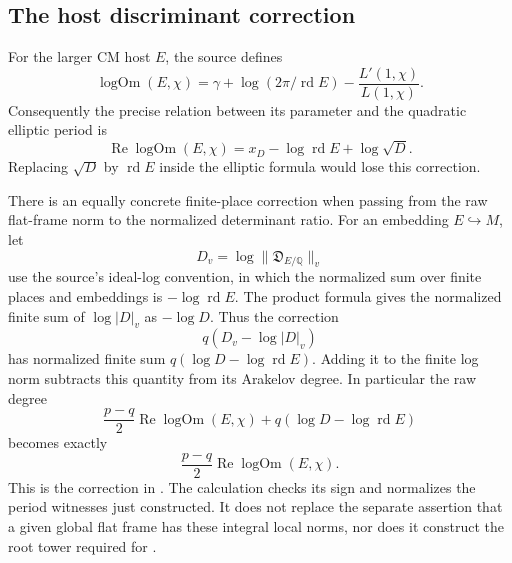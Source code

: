 \subsection{The host discriminant correction}

For the larger CM host \(E\), the source defines
\[
 \operatorname{logOm}(E,\chi)
    =\gamma+\log(2\pi/\operatorname{rd}E)
                            -\frac{L'(1,\chi)}{L(1,\chi)} .
\]
Consequently the precise relation between its parameter
and the quadratic elliptic period is
\begin{equation}\label{eq:sr-cm-period-host}
 \operatorname{Re}\operatorname{logOm}(E,\chi)
       =x_D-\log\operatorname{rd}E+\log\sqrt D .
\end{equation}
Replacing \(\sqrt D\) by \(\operatorname{rd}E\) inside
the elliptic formula would lose this correction.

There is an equally concrete finite-place correction
when passing from the raw flat-frame norm to the
normalized determinant ratio.
For an embedding \(E\hookrightarrow M\), let
\[
 D_v=\log\|\mathfrak D_{E/\mathbb Q}\|_v
\]
use the source's ideal-log convention, in which the
normalized sum over finite places and embeddings is
\(-\log\operatorname{rd}E\).
The product formula gives the normalized finite sum of
\(\log|D|_v\) as \(-\log D\).
Thus the correction
\[
                       q(D_v-\log|D|_v)
\]
has normalized finite sum
\(q(\log D-\log\operatorname{rd}E)\).
Adding it to the finite log norm subtracts this quantity
from its Arakelov degree.
In particular the raw degree
\[
 \frac{p-q}{2}\operatorname{Re}\operatorname{logOm}(E,\chi)
          +q(\log D-\log\operatorname{rd}E)
\]
becomes exactly
\[
                 \frac{p-q}{2}
                       \operatorname{Re}\operatorname{logOm}(E,\chi).
\]
This is the correction in
.
The calculation checks its sign and normalizes the
period witnesses just constructed.
It does not replace the separate assertion that a
given global flat frame has these integral local norms,
nor does it construct the root tower required for
.
